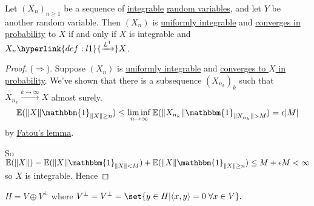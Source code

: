 \documentclass{article}
\newcommand{\1}[1]{\mathbbm{1}_{#1}}
\newcommand{\E}{\mathbb{E}}
\begin{document}
\begin{thm}
    Let $(X_n)_{n \geq 1}$ be a sequence of \hyperlink{def:integral}{integrable} \hyperlink{def:rv}{random variables}, and let $Y$ be another random variable.
    Then $(X_n)$ is \hyperlink{def:ui}{uniformly integrable} and \hyperlink{def:conv}{converges in probability} to $X$ if and only if $X$ is integrable and $X_n \hyperlink{def:l1}{\xrightarrow{L^1}} X$.
\end{thm}
\begin{proof}
    ($\Rightarrow$). Suppose $(X_n)$ is \hyperlink{def:ui}{uniformly integrable} and \hyperlink{def:conv}{converges to $X$ in probability}.
    We've shown that there is a subsequence $(X_{n_k})_k$ such that $X_{n_k} \xrightarrow{k \to \infty} X$ almost surely.
    \begin{equation*}
        \E(\|X\| \1{\|X\| \geq n}) \leq \liminf_{n \to \infty} \E(\|X_{n_k}\| \1{\|X_{n_k}\| > M}) = \epsilon |M|
    \end{equation*}
    by \hyperlink{thm:fatou}{Fatou's lemma}.

    So $\E(\|X\|) = \E(\|X\|\1{\|X\| < M}) + \E(\|X\|\1{\|X\| \geq n}) \leq M + \epsilon M < \infty$ so $X$ is integrable.
    Hence
\end{proof}

\begin{cor}
    $H = V \oplus V^\bot$ where $V^\bot = V^\bot = \set{y \in H| \langle x, y\rangle = 0 \; \forall x \in V}.$
\end{cor}
\end{document}
